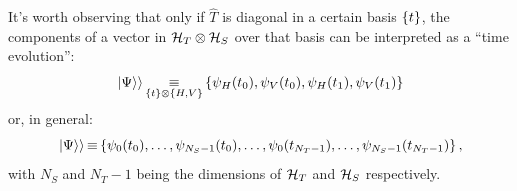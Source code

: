 It's worth observing that
only if $\hat{T}$ is diagonal in a certain basis $\qty{t}$,
the components of a vector in $\mathcal{H}_T \otimes \mathcal{H}_S$
over that basis
can be interpreted as a ``time evolution'':
\begin{equation}\label{eq:timepicks2}
  \left.\left| \Psi \right\rangle\right\rangle
  \operatorname*{\equiv}_{\qty{t} \otimes \qty{H,V}}
  \qty{\psi_H(t_0), \psi_V(t_0), \psi_H(t_1), \psi_V(t_1)}
\end{equation}
or, in general:
\begin{equation}\label{eq:timepicksN}
  \left.\left| \Psi \right\rangle\right\rangle
  \operatorname*{\equiv}
  \qty{
    \psi_0(t_0),
    \dotsc,
    \psi_{N_{S} - 1}(t_0),
    \dots,
    \psi_0(t_{N_{T}-1}),
    \dotsc,
    \psi_{N_{S} - 1}(t_{N_{T}-1})
  } \,\text{,}
\end{equation}
with $N_{S}$ and $N_{T}-1$ being the dimensions of $\mathcal{H}_T$ and $\mathcal{H}_S$ respectively.

